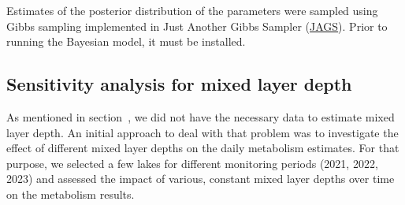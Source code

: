 \documentclass[11pt,lineno]{manuscript}\usepackage[]{graphicx}\usepackage[]{xcolor}
\begin{document}
Estimates of the posterior distribution of the parameters were sampled using
Gibbs sampling implemented in Just Another Gibbs Sampler
(\href{https://sourceforge.net/projects/mcmc-jags/files/}{JAGS}). Prior to running
the Bayesian model, it must be installed.

\subsection{Sensitivity analysis for mixed layer depth} \label{subsec:sens}

As mentioned in section~, we did not have the necessary
data to estimate mixed layer depth. An initial approach to deal with that problem
was to investigate the effect of different mixed layer depths on the daily metabolism
estimates. For that purpose, we selected a few lakes for different monitoring
periods (2021, 2022, 2023) and assessed the impact of various, constant
mixed layer depths over time on the metabolism results.
\end{document}
